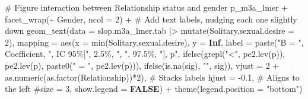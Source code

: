 \documentclass[
  bookmarksnumbered]{article}
\newenvironment{Shaded}{\begin{snugshade}}{\end{snugshade}}
\newcommand{\AttributeTok}[1]{\textcolor[rgb]{0.80,0.80,0.80}{#1}}
\newcommand{\CommentTok}[1]{\textcolor[rgb]{0.50,0.62,0.50}{#1}}
\newcommand{\ConstantTok}[1]{\textcolor[rgb]{0.86,0.64,0.64}{\textbf{#1}}}
\newcommand{\DecValTok}[1]{\textcolor[rgb]{0.86,0.86,0.80}{#1}}
\newcommand{\FloatTok}[1]{\textcolor[rgb]{0.75,0.75,0.82}{#1}}
\newcommand{\FunctionTok}[1]{\textcolor[rgb]{0.94,0.94,0.56}{#1}}
\newcommand{\NormalTok}[1]{\textcolor[rgb]{0.80,0.80,0.80}{#1}}
\newcommand{\SpecialCharTok}[1]{\textcolor[rgb]{0.86,0.64,0.64}{#1}}
\newcommand{\StringTok}[1]{\textcolor[rgb]{0.80,0.58,0.58}{#1}}
\begin{document}
\begin{Shaded}
\begin{Highlighting}[]
\CommentTok{\# Figure interaction between Relationship status and gender}
\NormalTok{p\_m3a\_lmer  }\SpecialCharTok{+}
  \FunctionTok{facet\_wrap}\NormalTok{(}\SpecialCharTok{\textasciitilde{}}\NormalTok{ Gender, }\AttributeTok{ncol =} \DecValTok{2}\NormalTok{) }\SpecialCharTok{+}
  \CommentTok{\# Add text labels, nudging each one slightly down}
  \FunctionTok{geom\_text}\NormalTok{(}\AttributeTok{data =}\NormalTok{ slop.m3a\_lmer.tab }\SpecialCharTok{|\textgreater{}} 
              \FunctionTok{mutate}\NormalTok{(}\AttributeTok{Solitary.sexual.desire =} \DecValTok{2}\NormalTok{),}
            \AttributeTok{mapping =} \FunctionTok{aes}\NormalTok{(}\AttributeTok{x =} \FunctionTok{min}\NormalTok{(Solitary.sexual.desire), }\AttributeTok{y =} \ConstantTok{Inf}\NormalTok{, }
                          \AttributeTok{label =} \FunctionTok{paste}\NormalTok{(}\StringTok{"B = "}\NormalTok{, Coefficient, }
                                        \StringTok{", IC 95\%["}\NormalTok{, }\StringTok{\textasciigrave{}}\AttributeTok{2.5\%}\StringTok{\textasciigrave{}}\NormalTok{, }\StringTok{", "}\NormalTok{, }\StringTok{\textasciigrave{}}\AttributeTok{97.5\%}\StringTok{\textasciigrave{}}\NormalTok{, }
                                        \StringTok{"], p"}\NormalTok{, }
                                        \FunctionTok{ifelse}\NormalTok{(}\FunctionTok{grepl}\NormalTok{(}\StringTok{"\textless{}"}\NormalTok{, }\FunctionTok{pe2.lev}\NormalTok{(p)), }\FunctionTok{pe2.lev}\NormalTok{(p), }
                                               \FunctionTok{paste0}\NormalTok{(}\StringTok{" = "}\NormalTok{, }\FunctionTok{pe2.lev}\NormalTok{(p))),}
                                        \FunctionTok{ifelse}\NormalTok{(}\FunctionTok{is.na}\NormalTok{(sig), }\StringTok{""}\NormalTok{, sig)),}
                          \AttributeTok{vjust =} \DecValTok{2} \SpecialCharTok{+} \FunctionTok{as.numeric}\NormalTok{(}\FunctionTok{as.factor}\NormalTok{(Relationship))}\SpecialCharTok{*}\DecValTok{2}\NormalTok{),  }\CommentTok{\# Stacks labels}
            \AttributeTok{hjust =} \SpecialCharTok{{-}}\FloatTok{0.1}\NormalTok{,  }\CommentTok{\# Aligns to the left}
            \CommentTok{\#size = 3,}
            \AttributeTok{show.legend =} \ConstantTok{FALSE}\NormalTok{) }\SpecialCharTok{+}
  \FunctionTok{theme}\NormalTok{(}\AttributeTok{legend.position =} \StringTok{"bottom"}\NormalTok{)}
\end{Highlighting}
\end{Shaded}
\end{document}
